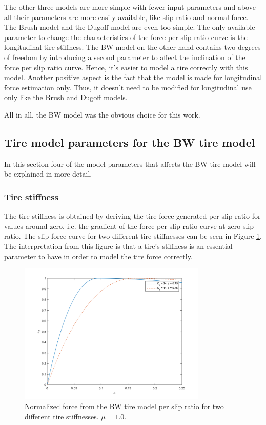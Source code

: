 The other three models are more simple with fewer input parameters and above all their parameters are more easily available, like slip ratio and normal force. The Brush model and the Dugoff model are even too simple. The only available parameter to change the characteristics of the force per slip ratio curve is the longitudinal tire stiffness. The BW model on the other hand contains two degrees of freedom by introducing a second parameter to affect the inclination of the force per slip ratio curve. Hence, it's easier to model a tire correctly with this model. Another positive aspect is the fact that the model is made for longitudinal force estimation only. Thus, it doesn't need to be modified for longitudinal use only like the Brush and Dugoff models.

All in all, the BW model was the obvious choice for this work.

\subsection{Tire model parameters for the BW tire model}
In this section four of the model parameters that affects the BW tire model will be explained in more detail.

\subsubsection{Tire stiffness}
The tire stiffness is obtained by deriving the tire force generated per slip ratio for values around zero, i.e. the gradient of the force per slip ratio curve at zero slip ratio. The slip force curve for two different tire stiffnesses can be seen in Figure \ref{different_cx}. The interpretation from this figure is that a tire's stiffness is an essential parameter to have in order to model the tire force correctly. 

\begin{figure}[h]
	\centering
	\includegraphics[width=0.8\textwidth]{Pictures/slipkraft_olika_cx}
	\caption {Normalized force from the BW tire model per slip ratio for two different tire stiffnesses. $ \mu = 1.0 $.}
	\label{different_cx}
\end{figure}

